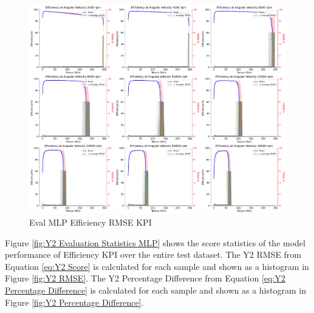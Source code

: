 \documentclass{report} %
\begin{document}
\begin{figure}[H]
    \centering
    \includegraphics[width=1\textwidth]{./ReportImages/rmse_eta_MLP.png} 
    \caption{Eval MLP Efficiency \ac{RMSE} \ac{KPI}} 
    \label{fig:Eval MLP Efficiency RMSE KPI}
\end{figure}

Figure \ref{fig:Y2 Evaluation Statistics MLP} shows the score statistics of the model performance of Efficiency \ac{KPI} over the entire test dataset.
The Y2 \ac{RMSE} from Equation \ref{eq:Y2 Score} is calculated for each sample and shown as a histogram in Figure \ref{fig:Y2 RMSE}.
The Y2 Percentage Difference from Equation \ref{eq:Y2 Percentage Difference} is calculated for each sample and shown as a histogram in Figure \ref{fig:Y2 Percentage Difference}.\\
\end{document}
